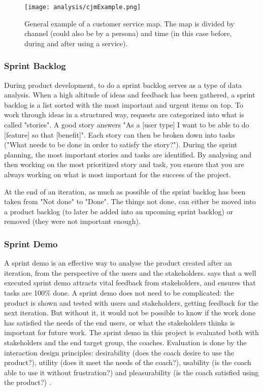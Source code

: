 \begin{figure}[h]
    \centering
    \texttt{[image: analysis/cjmExample.png]}
    \caption{General example of a customer service map. The map is divided by channel (could also be by a persona) and time (in this case before, during and after using a service).}
    \label{fig:cjmExample}
\end{figure}

\subsubsection{Sprint Backlog}
During product development, to do a sprint backlog serves as a type of data analysis. When a high altitude of ideas and feedback has been gathered, a sprint backlog is a list sorted with the most important and urgent items on top. To work through ideas in a structured way, requests are categorized into what is called "stories". A good story answers "As a [user type] I want to be able to do [feature] so that [benefit]". Each story can then be broken down into tasks ("What needs to be done in order to satisfy the story?"). During the sprint planning, the most important stories and tasks are identified. By analysing and then working on the most prioritized story and task, you ensure that you are always working on what is most important for the success of the project.

At the end of an iteration, as much as possible of the sprint backlog has been taken from "Not done" to "Done". The things not done, can either be moved into a product backlog (to later be added into an upcoming sprint backlog) or removed (they were not important enough).

\subsubsection{Sprint Demo}
A sprint demo is an effective way to analyse the product created after an iteration, from the perspective of the users and the stakeholders. \cite{kniberg} says that a well executed sprint demo attracts vital feedback from stakeholders, and ensures that tasks are 100\% done. A sprint demo does not need to be complicated: the product is shown and tested with users and stakeholders, getting feedback for the next iteration. But without it, it would not be possible to know if the work done has satisfied the needs of the end users, or what the stakeholders thinks is important for future work. The sprint demo in this project is evaluated both with stakeholders and the end target group, the coaches. Evaluation is done by the interaction design principles: desirability (does the coach desire to use the product?), utility (does it meet the needs of the coach?), usability (is the coach able to use it without frustration?) and pleasurability (is the coach satisfied using the product?) \citep{lowgren}.


